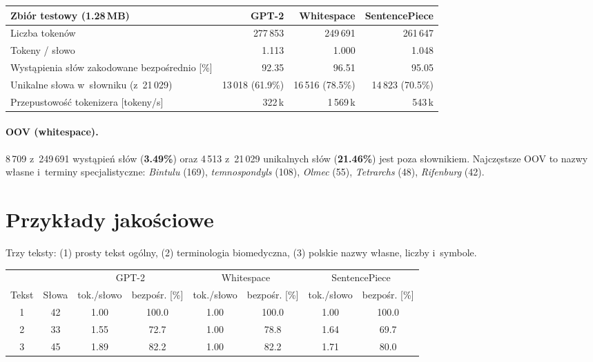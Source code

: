 \documentclass[11pt,a4paper]{article}
\begin{document}
\begin{center}\small
\begin{tabular}{@{}lrrr@{}}
\toprule
Zbiór testowy (1.28\,MB) & GPT-2 & Whitespace & SentencePiece \\
\midrule
Liczba tokenów & 277\,853 & 249\,691 & 261\,647 \\
Tokeny / słowo & 1.113 & 1.000 & 1.048 \\
Wystąpienia słów zakodowane bezpośrednio [\%] & 92.35 & 96.51 & 95.05 \\
Unikalne słowa w~słowniku (z~21\,029) & 13\,018 (61.9\%) & 16\,516 (78.5\%) & 14\,823 (70.5\%) \\
Przepustowość tokenizera [tokeny/s] & 322\,k & 1\,569\,k & 543\,k \\
\bottomrule
\end{tabular}
\end{center}

\paragraph{OOV (whitespace).} 8\,709 z~249\,691 wystąpień słów (\textbf{3.49\%}) oraz 4\,513 z~21\,029 unikalnych słów (\textbf{21.46\%}) jest poza słownikiem. Najczęstsze OOV to nazwy własne i~terminy specjalistyczne: \emph{Bintulu} (169), \emph{temnospondyls} (108), \emph{Olmec} (55), \emph{Tetrarchs} (48), \emph{Rifenburg} (42).

\section{Przykłady jakościowe}

Trzy teksty: (1) prosty tekst ogólny, (2) terminologia biomedyczna, (3) polskie nazwy własne, liczby i~symbole.

\begin{center}\small
\begin{tabular}{@{}cc cc cc cc@{}}
\toprule
 & & \multicolumn{2}{c}{GPT-2} & \multicolumn{2}{c}{Whitespace} & \multicolumn{2}{c}{SentencePiece} \\
\cmidrule(lr){3-4}\cmidrule(lr){5-6}\cmidrule(l){7-8}
Tekst & Słowa & tok./słowo & bezpośr. [\%] & tok./słowo & bezpośr. [\%] & tok./słowo & bezpośr. [\%] \\
\midrule
1 & 42 & 1.00 & 100.0 & 1.00 & 100.0 & 1.00 & 100.0 \\
2 & 33 & 1.55 & 72.7 & 1.00 & 78.8 & 1.64 & 69.7 \\
3 & 45 & 1.89 & 82.2 & 1.00 & 82.2 & 1.71 & 80.0 \\
\bottomrule
\end{tabular}
\end{center}
\end{document}
